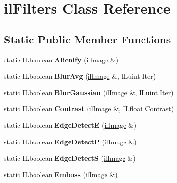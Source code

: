 \hypertarget{classilFilters}{}\section{il\+Filters Class Reference}
\label{classilFilters}
\subsection*{Static Public Member Functions}
\begin{DoxyCompactItemize}
\item 
\mbox{\label{classilFilters_a39f5cdc816a4691813628f23fc011ddd}} 
static I\+Lboolean {\bfseries Alienify} (\hyperlink{classilImage}{il\+Image} \&)
\item 
\mbox{\label{classilFilters_a9a0fe4ff6a9e6f004c25827e715342f0}} 
static I\+Lboolean {\bfseries Blur\+Avg} (\hyperlink{classilImage}{il\+Image} \&, I\+Luint Iter)
\item 
\mbox{\label{classilFilters_af474596ccbbe56d4f35d70df498d3f4f}} 
static I\+Lboolean {\bfseries Blur\+Gaussian} (\hyperlink{classilImage}{il\+Image} \&, I\+Luint Iter)
\item 
\mbox{\label{classilFilters_a1306b35ef3a71e8ad90f9c8e70fd166f}} 
static I\+Lboolean {\bfseries Contrast} (\hyperlink{classilImage}{il\+Image} \&, I\+Lfloat Contrast)
\item 
\mbox{\label{classilFilters_a117031bdfeb4bdd33dbd95ec02d8e922}} 
static I\+Lboolean {\bfseries Edge\+DetectE} (\hyperlink{classilImage}{il\+Image} \&)
\item 
\mbox{\label{classilFilters_af7861900465babb0cddd16626325984d}} 
static I\+Lboolean {\bfseries Edge\+DetectP} (\hyperlink{classilImage}{il\+Image} \&)
\item 
\mbox{\label{classilFilters_a4561ad086b785ffade8e59684cfc82fa}} 
static I\+Lboolean {\bfseries Edge\+DetectS} (\hyperlink{classilImage}{il\+Image} \&)
\item 
\mbox{\label{classilFilters_a4be04235906fc7ee177deabf45206ee6}} 
static I\+Lboolean {\bfseries Emboss} (\hyperlink{classilImage}{il\+Image} \&)

\end{DoxyCompactItemize}
